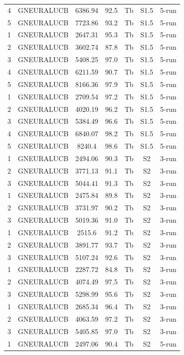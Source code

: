 \documentclass[11pt]{article}
\begin{document}
\begin{center}
\begin{longtable}{|c|c|c|c|c|c|c|}
4 & GNEURALUCB & 6386.94 & 92.5 & Tb & S1.5 & 5-run \\
5 & GNEURALUCB & 7723.86 & 93.2 & Tb & S1.5 & 5-run \\
1 & GNEURALUCB & 2647.31 & 95.3 & Tb & S1.5 & 5-run \\
2 & GNEURALUCB & 3602.74 & 87.8 & Tb & S1.5 & 5-run \\
3 & GNEURALUCB & 5408.25 & 97.0 & Tb & S1.5 & 5-run \\
4 & GNEURALUCB & 6211.59 & 90.7 & Tb & S1.5 & 5-run \\
5 & GNEURALUCB & 8166.36 & 97.9 & Tb & S1.5 & 5-run \\
1 & GNEURALUCB & 2709.54 & 97.2 & Tb & S1.5 & 5-run \\
2 & GNEURALUCB & 4020.19 & 96.2 & Tb & S1.5 & 5-run \\
3 & GNEURALUCB & 5384.49 & 96.6 & Tb & S1.5 & 5-run \\
4 & GNEURALUCB & 6840.07 & 98.2 & Tb & S1.5 & 5-run \\
5 & GNEURALUCB & 8240.4 & 98.6 & Tb & S1.5 & 5-run \\
1 & GNEURALUCB & 2494.06 & 90.3 & Tb & S2 & 3-run \\
2 & GNEURALUCB & 3771.13 & 91.1 & Tb & S2 & 3-run \\
3 & GNEURALUCB & 5044.41 & 91.3 & Tb & S2 & 3-run \\
1 & GNEURALUCB & 2475.84 & 89.8 & Tb & S2 & 3-run \\
2 & GNEURALUCB & 3731.97 & 90.2 & Tb & S2 & 3-run \\
3 & GNEURALUCB & 5019.36 & 91.0 & Tb & S2 & 3-run \\
1 & GNEURALUCB & 2515.6 & 91.2 & Tb & S2 & 3-run \\
2 & GNEURALUCB & 3891.77 & 93.7 & Tb & S2 & 3-run \\
3 & GNEURALUCB & 5107.24 & 92.6 & Tb & S2 & 3-run \\
1 & GNEURALUCB & 2287.72 & 84.8 & Tb & S2 & 3-run \\
2 & GNEURALUCB & 4074.49 & 97.5 & Tb & S2 & 3-run \\
3 & GNEURALUCB & 5298.99 & 95.6 & Tb & S2 & 3-run \\
1 & GNEURALUCB & 2685.34 & 96.4 & Tb & S2 & 3-run \\
2 & GNEURALUCB & 4063.59 & 97.2 & Tb & S2 & 3-run \\
3 & GNEURALUCB & 5405.85 & 97.0 & Tb & S2 & 3-run \\
1 & GNEURALUCB & 2497.06 & 90.4 & Tb & S2 & 5-run \\

\end{longtable}
\end{center}
\end{document}
